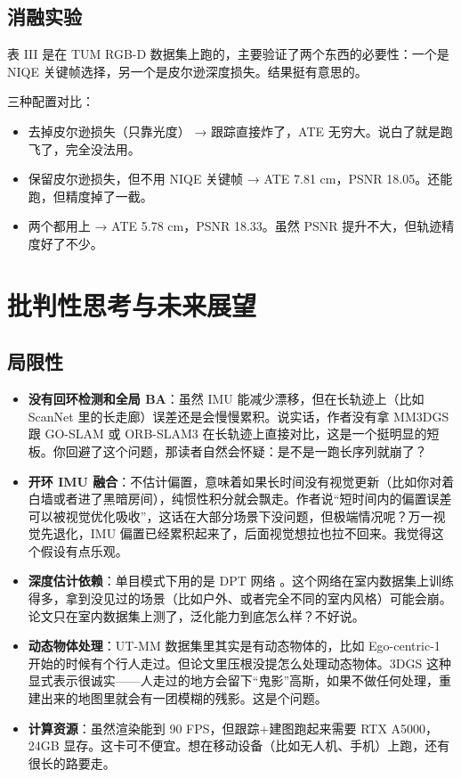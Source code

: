 \documentclass[12pt,a4paper,onecolumn]{article}
\begin{document}
\subsection{消融实验}

表 III 是在 TUM RGB-D 数据集上跑的，主要验证了两个东西的必要性：一个是 NIQE 关键帧选择，另一个是皮尔逊深度损失。结果挺有意思的。

三种配置对比：
\begin{itemize}
    \item 去掉皮尔逊损失（只靠光度） → 跟踪直接炸了，ATE 无穷大。说白了就是跑飞了，完全没法用。
    \item 保留皮尔逊损失，但不用 NIQE 关键帧 → ATE 7.81 cm，PSNR 18.05。还能跑，但精度掉了一截。
    \item 两个都用上 → ATE 5.78 cm，PSNR 18.33。虽然 PSNR 提升不大，但轨迹精度好了不少。
\end{itemize}

\section{批判性思考与未来展望}

\subsection{局限性}

\begin{itemize}
    \item \textbf{没有回环检测和全局 BA}：虽然 IMU 能减少漂移，但在长轨迹上（比如 ScanNet 里的长走廊）误差还是会慢慢累积。说实话，作者没有拿 MM3DGS 跟 GO-SLAM \cite{GO-SLAM} 或 ORB-SLAM3 \cite{ORB-SLAM3} 在长轨迹上直接对比，这是一个挺明显的短板。你回避了这个问题，那读者自然会怀疑：是不是一跑长序列就崩了？

    \item \textbf{开环 IMU 融合}：不估计偏置，意味着如果长时间没有视觉更新（比如你对着白墙或者进了黑暗房间），纯惯性积分就会飘走。作者说“短时间内的偏置误差可以被视觉优化吸收”，这话在大部分场景下没问题，但极端情况呢？万一视觉先退化，IMU 偏置已经累积起来了，后面视觉想拉也拉不回来。我觉得这个假设有点乐观。

    \item \textbf{深度估计依赖}：单目模式下用的是 DPT 网络 \cite{DPT}。这个网络在室内数据集上训练得多，拿到没见过的场景（比如户外、或者完全不同的室内风格）可能会崩。论文只在室内数据集上测了，泛化能力到底怎么样？不好说。

    \item \textbf{动态物体处理}：UT-MM 数据集里其实是有动态物体的，比如 Ego-centric-1 开始的时候有个行人走过。但论文里压根没提怎么处理动态物体。3DGS 这种显式表示很诚实——人走过的地方会留下“鬼影”高斯，如果不做任何处理，重建出来的地图里就会有一团模糊的残影。这是个问题。

    \item \textbf{计算资源}：虽然渲染能到 90 FPS，但跟踪+建图跑起来需要 RTX A5000，24GB 显存。这卡可不便宜。想在移动设备（比如无人机、手机）上跑，还有很长的路要走。
\end{itemize}
\end{document}
